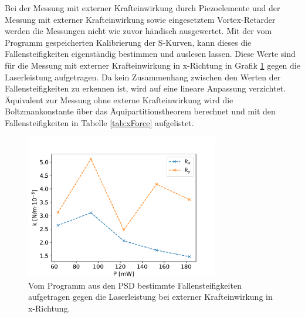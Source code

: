             Bei der Messung mit externer Krafteinwirkung durch Piezoelemente und der Messung mit externer Krafteinwirkung sowie eingesetztem Vortex-Retarder werden die Messungen nicht wie zuvor händisch
            ausgewertet. Mit der vom Programm gespeicherten Kalibrierung der S-Kurven, kann dieses die Fallensteifigkeiten eigenständig bestimmen und auslesen lassen. Diese Werte sind für die Messung mit
            externer Krafteinwirkung in x-Richtung in Grafik \ref{fig:k_xForce} gegen die Laserleistung aufgetragen. Da kein Zusammenhang zwischen den Werten der Fallensteifigkeiten zu erkennen ist, wird 
            auf eine lineare Anpassung verzichtet. Äquivalent zur Messung ohne externe Krafteinwirkung wird die Boltzmankonstante über das Äquipartitionstheorem berechnet und mit den Fallensteifigkeiten
            in Tabelle \ref{tab:xForce} aufgelistet. 
            \begin{figure}[h]
            \centering
            \includegraphics[width = 0.75\textwidth]{k_xForce.pdf}
            \caption{Vom Programm aus den PSD bestimmte Fallensteifigkeiten aufgetragen gegen die Laserleistung bei externer Krafteinwirkung in x-Richtung.}
            \label{fig:k_xForce}
            \end{figure}
            \FloatBarrier
